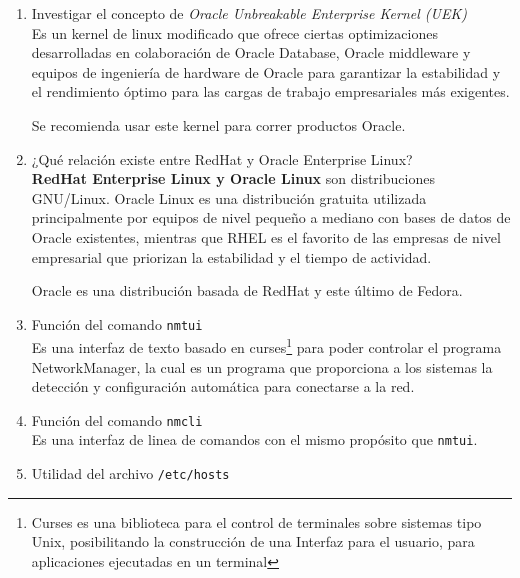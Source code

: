 \documentclass[../main.tex]{subfiles}
\begin{document}
\begin{enumerate}
  \item Investigar el concepto de \textit{Oracle Unbreakable Enterprise Kernel (UEK)}\\

        Es un kernel de linux modificado que ofrece ciertas optimizaciones desarrolladas
        en colaboración de Oracle Database, Oracle middleware y equipos de ingeniería de
        hardware de Oracle para garantizar la estabilidad y el rendimiento óptimo para
        las cargas de trabajo empresariales más exigentes\cite{oracle2021}.

        Se recomienda usar este kernel para correr productos Oracle.\\

  \item ¿Qué relación existe entre RedHat y Oracle Enterprise Linux?\\

        \textbf{RedHat Enterprise Linux y Oracle Linux} son distribuciones
        GNU/Linux. Oracle Linux es una distribución gratuita utilizada principalmente
        por equipos de nivel pequeño a mediano con bases de datos de Oracle
        existentes, mientras que RHEL es el favorito de las empresas de nivel
        empresarial que priorizan la estabilidad y el tiempo de actividad.

        Oracle es una distribución basada de RedHat y este último de Fedora\cite{dw}.\\

  \item Función del comando \texttt{nmtui}\\

        Es una interfaz de texto basado en curses\footnote{Curses es una biblioteca para el control de terminales sobre sistemas tipo Unix, posibilitando la construcción de una Interfaz para el usuario, para aplicaciones ejecutadas en un terminal} para poder controlar el programa
        NetworkManager, la cual es un programa que proporciona a los sistemas la
        detección y configuración automática para conectarse a la red\cite{archwiki:nm}.
  \item Función del comando \texttt{nmcli}\\

        Es una interfaz de linea de comandos con el mismo propósito que \texttt{nmtui}\cite{archwiki:nm}.\\

  \item Utilidad del archivo \texttt{/etc/hosts}\\


\end{enumerate}
\end{document}
